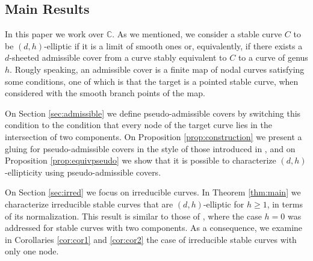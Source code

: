 \documentclass{article}
\renewcommand{\:}{\colon }
\begin{document}
%
%
%
%





\subsection{Main Results}

 
In this paper we work over $\mathbb{C}$.
As we mentioned, we consider a stable curve $C$ to be $(d,h)$-elliptic if it is a limit of smooth ones or, equivalently, if there exists a $d$-sheeted admissible cover from a curve stably equivalent to $C$ to a curve of genus $h$. 
Rougly speaking, an admissible cover is a finite map of nodal curves satisfying some conditions, one of which is that the target is a pointed stable curve, when considered with the smooth branch points of the map. 


On Section \ref{sec:admissible} we define pseudo-admissible covers by switching this condition to the condition that every node of the target curve lies in the intersection of two components. 
On Proposition \ref{prop:construction} we present a gluing for pseudo-admissible covers in the style of those introduced in \cite{paper1}, and 
on Proposition \ref{prop:equivpseudo} we show that it is possible to characterize $(d,h)$-ellipticity using pseudo-admissible covers.

On Section \ref{sec:irred} we focus on irreducible curves. 
In Theorem \ref{thm:main} we characterize irreducible stable curves  that are $(d,h)$-elliptic for $h\geq 1$, in terms of its normalization. 
This result is similar to those of \cite{paper2}, where the case  $h=0$ was addressed for stable curves with two components.
As a consequence, we examine in Corollaries \ref{cor:cor1} and \ref{cor:cor2} the case of irreducible stable curves with only one node.
\end{document}
